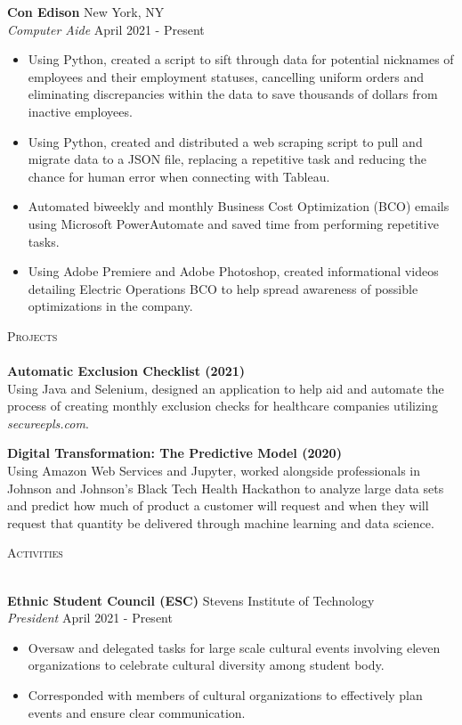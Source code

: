 \documentclass[10pt]{article}
\newcommand{\lineunder} {
    \vspace*{-8pt} \\
    \hspace*{-18pt} \hrulefill \\
}
\newcommand{\header} [1] {
    {\hspace*{-18pt}\vspace*{6pt} \textsc{#1}}
    \vspace*{-6pt} \lineunder
}
\begin{document}
\textbf{Con Edison} \hfill New York, NY\\
\textit{Computer Aide} \hfill April 2021 - Present\\
\vspace{-1mm}
\begin{itemize} \itemsep 1pt
    \item Using Python, created a script to sift through data for potential nicknames of employees and their employment statuses, cancelling uniform orders and eliminating discrepancies within the data to save thousands of dollars from inactive employees.
    \item Using Python, created and distributed a web scraping script to pull and migrate data to a JSON file, replacing a repetitive task and reducing the chance for human error when connecting with Tableau.
    \item Automated biweekly and monthly Business Cost Optimization (BCO) emails using Microsoft PowerAutomate and saved time from performing repetitive tasks.
    \item Using Adobe Premiere and Adobe Photoshop, created informational videos detailing Electric Operations BCO to help spread awareness of possible optimizations in the company.
\end{itemize}

\header{Projects}

{\textbf{Automatic Exclusion Checklist (2021)}} \hfill 
\\
Using Java and Selenium, designed an application to help aid and automate the process of creating monthly exclusion checks for healthcare companies utilizing \textit{secureepls.com}.\\
\vspace*{2mm}

{\textbf{Digital Transformation: The Predictive Model (2020)}} \hfill 
\\
Using Amazon Web Services and Jupyter, worked alongside professionals in Johnson and Johnson's Black Tech Health Hackathon to analyze large data sets and predict how much of product a customer will request and when they will request that quantity be delivered through machine learning and data science.\\
\vspace*{2mm}


\header{Activities}
\vspace{1mm}

\textbf{Ethnic Student Council (ESC)} \hfill Stevens Institute of Technology\\
\textit{President} \hfill April 2021 - Present\\
\vspace{-1mm}
\begin{itemize} \itemsep 1pt
    \item Oversaw and delegated tasks for large scale cultural events involving eleven organizations to celebrate cultural diversity among student body.
    \item Corresponded with members of cultural organizations to effectively plan events and ensure clear communication.
\end{itemize}
\end{document}
